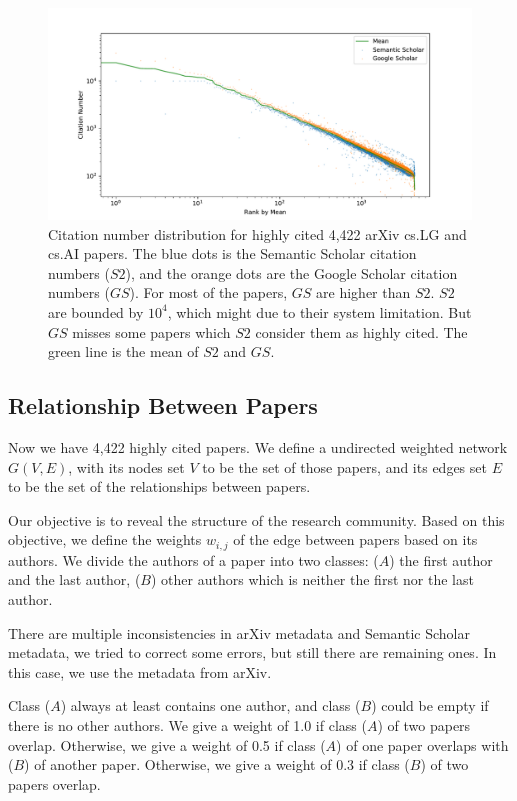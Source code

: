 \begin{figure}
    \centering
    \includegraphics[width=\textwidth]{images/citation_number_distribution.pdf}
    \caption{Citation number distribution for highly cited 4,422 arXiv cs.LG and cs.AI papers. 
    The blue dots is the Semantic Scholar citation numbers ($S2$), 
    and the orange dots are the Google Scholar citation numbers ($GS$). 
    For most of the papers, $GS$ are higher than $S2$.
    $S2$ are bounded by $10^4$, which might due to their system limitation.
    But $GS$ misses some papers which $S2$ consider them as highly cited.
    The green line is the mean of $S2$ and $GS$.
    }
    \label{fig:distribution}
\end{figure}

\subsection{Relationship Between Papers}

Now we have 4,422 highly cited papers.
We define a undirected weighted network $G(V,E)$, with its nodes set $V$ to be the set of those papers, and its edges set $E$ to be the set of the relationships between papers.

Our objective is to reveal the structure of the research community.
Based on this objective, we define the weights $w_{i,j}$ of the edge between papers based on its authors.
We divide the authors of a paper into two classes: ($A$) the first author and the last author, ($B$) other authors which is neither the first nor the last author.

There are multiple inconsistencies in arXiv metadata and Semantic Scholar metadata, we tried to correct some errors, but still there are remaining ones.
In this case, we use the metadata from arXiv.

Class ($A$) always at least contains one author, and class ($B$) could be empty if there is no other authors.
We give a weight of 1.0 if class ($A$) of two papers overlap.
Otherwise, we give a weight of 0.5 if class ($A$) of one paper overlaps with ($B$) of another paper.
Otherwise, we give a weight of 0.3 if class ($B$) of two papers overlap.

